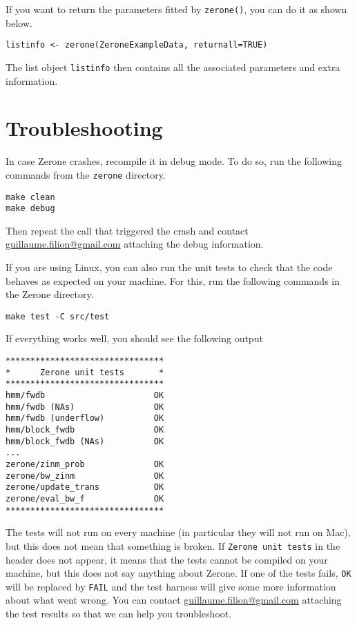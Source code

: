 \documentclass[12pt]{article}
\begin{document}
If you want to return the parameters fitted by \texttt{zerone()},
you can do it as shown below.

\begin{verbatim}
listinfo <- zerone(ZeroneExampleData, returnall=TRUE)
\end{verbatim}

The list object \texttt{listinfo} then contains all the associated
parameters and extra information.

\section{Troubleshooting}

In case Zerone crashes, recompile it in debug mode. To do so,
run the following commands from the \texttt{zerone} directory.

\begin{verbatim}
make clean
make debug
\end{verbatim}

Then repeat the call that triggered the crash and contact
\href{mailto:guillaume.filion@gmail.com}{guillaume.filion@gmail.com}
attaching the debug information.

If you are using Linux, you can also run the unit tests to check
that the code behaves as expected on your machine. For this,
run the following commands in the Zerone directory.

\begin{verbatim}
make test -C src/test
\end{verbatim}

If everything works well, you should see the following output

\begin{verbatim}
********************************
*      Zerone unit tests       *
********************************
hmm/fwdb                      OK
hmm/fwdb (NAs)                OK
hmm/fwdb (underflow)          OK
hmm/block_fwdb                OK
hmm/block_fwdb (NAs)          OK
...
zerone/zinm_prob              OK
zerone/bw_zinm                OK
zerone/update_trans           OK
zerone/eval_bw_f              OK
********************************
\end{verbatim}

The tests will not run on every machine (in particular they will
not run on Mac), but this does not mean that something is broken.
If \texttt{Zerone unit tests} in the header does not appear, it
means that the tests cannot be compiled on your machine, but this
does not say anything about Zerone. If one of the tests fails,
\texttt{OK} will be replaced by \texttt{FAIL} and the test harness
will give some more information about what went wrong. You can contact
\href{mailto:guillaume.filion@gmail.com}{guillaume.filion@gmail.com}
attaching the test results so that we can help you troubleshoot.
\end{document}
